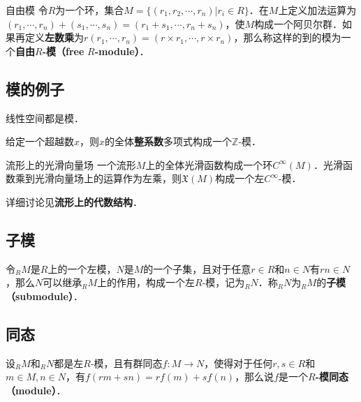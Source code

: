 \begin{definition}{自由模}
令$R$为一个环，集合$M=\{(r_1, r_2, \cdots, r_n)|r_i\in R\}$．在$M$上定义加法运算为$(r_1, \cdots, r_n)+(s_1, \cdots, s_n)=(r_1+s_1, \cdots, r_n+s_n)$，使$M$构成一个阿贝尔群．如果再定义\textbf{左数乘}为$r(r_1, \cdots, r_n)=(r\times r_1, \cdots, r\times r_n)$，那么称这样的到的模为一个\textbf{自由}$R$\textbf{-模（free} $R$\textbf{-module）}．
\end{definition}





\subsection{模的例子}

\begin{example}{}
线性空间都是模．
\end{example}

\begin{example}{}
给定一个超越数$x$，则$x$的全体\textbf{整系数}多项式构成一个$\mathbb{Z}$-模．
\end{example}

\begin{example}{流形上的光滑向量场}
一个流形$M$上的全体光滑函数构成一个环$C^{\infty}(M)$．光滑函数乘到光滑向量场上的运算作为左乘，则$\mathfrak{X}(M)$构成一个左$C^{\infty}$-模．

详细讨论见\textbf{流形上的代数结构}．
\end{example}


\subsection{子模}

令$_RM$是$R$上的一个左模，$N$是$M$的一个子集，且对于任意$r\in R$和$n\in N$有$rn\in N$，那么$N$可以继承$_RM$上的作用，构成一个左$R$-模，记为$_RN$．称$_RN$为$_RM$的\textbf{子模（submodule）}．


\subsection{同态}

设$_RM$和$_RN$都是左$R$-模，且有群同态$f:M\to N$，使得对于任何$r, s\in R$和$m\in M, n\in N$，有$f(rm+sn)=rf(m)+sf(n)$，那么说$f$是一个$R$\textbf{-模同态（module）}．












